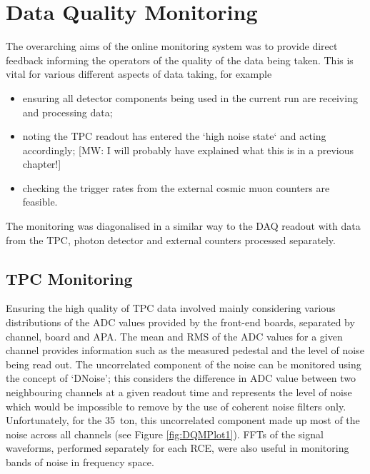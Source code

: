 \section{Data Quality Monitoring}\label{sec:DQM}

The overarching aims of the online monitoring system was to provide direct feedback informing the operators of the quality of the data being taken.  This is vital for various different aspects of data taking, for example
\begin{itemize}
\item ensuring all detector components being used in the current run are receiving and processing data;
\item noting the TPC readout has entered the `high noise state` and acting accordingly; [MW: I will probably have explained what this is in a previous chapter!]
\item checking the trigger rates from the external cosmic muon counters are feasible.
\end{itemize}

The monitoring was diagonalised in a similar way to the DAQ readout with data from the TPC, photon detector and external counters processed separately.

\subsection{TPC Monitoring}\label{sec:TPCMonitoring}

Ensuring the high quality of TPC data involved mainly considering various distributions of the ADC values provided by the front-end boards, separated by channel, board and APA.  The mean and RMS of the ADC values for a given channel provides information such as the measured pedestal and the level of noise being read out.  The uncorrelated component of the noise can be monitored using the concept of `DNoise'; this considers the difference in ADC value between two neighbouring channels at a given readout time and represents the level of noise which would be impossible to remove by the use of coherent noise filters only.  Unfortunately, for the 35~ton, this uncorrelated component made up most of the noise across all channels (see Figure \ref{fig:DQMPlot1}).  FFTs of the signal waveforms, performed separately for each RCE, were also useful in monitoring bands of noise in frequency space.


